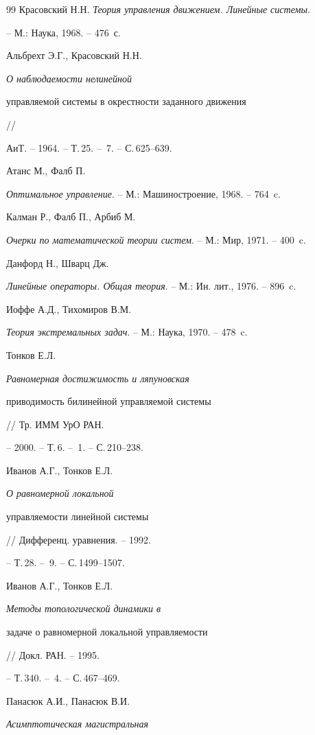 \begin{thebibliography}{99}
Красовский Н.Н. {\em Теория управления движением. Линейные системы}.


-- М.: Наука, 1968. -- 476~с.




Альбрехт Э.Г., Красовский Н.Н. {\em О наблюдаемости нелинейной


управляемой системы в окрестности заданного движения} //


АиТ. -- 1964. -- Т.\,25. -- \No\,7. -- С.\,625--639.




Атанс М., Фалб П.


{\em Оптимальное управление}. -- М.: Машиностроение, 1968. -- 764~c.




Калман Р., Фалб П., Арбиб М.


{\em Очерки по математической теории систем}. -- М.: Мир, 1971. -- 400~c.




Данфорд Н., Шварц Дж.


{\em Линейные операторы. Общая теория}. -- М.: Ин. лит., 1976. -- 896~c.




Иоффе А.Д., Тихомиров В.М.


{\em Теория экстремальных задач}. -- М.: Наука, 1970. -- 478~c.




Тонков Е.Л. {\em Равномерная достижимость и ляпуновская


приводимость билинейной управляемой системы} // Тр. ИММ УрО РАН.


-- 2000. -- Т.\,6. -- \No\,1. -- С.\,210--238.




Иванов А.Г., Тонков Е.Л. {\em О равномерной локальной


управляемости линейной системы} // Дифференц. уравнения. -- 1992. 


-- Т.\,28. -- \No\,9. -- С.\,1499--1507.




Иванов А.Г., Тонков Е.Л. {\em Методы топологической динамики в


задаче о равномерной локальной управляемости} // Докл. РАН. -- 1995.


-- Т.\,340. -- \No\,4. -- С.\,467--469.




Панасюк А.И., Панасюк В.И. {\em Асимптотическая магистральная


}
\end{thebibliography}
